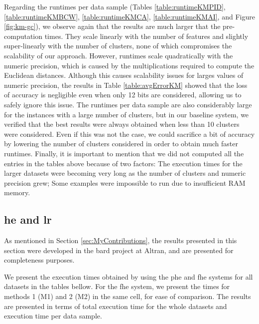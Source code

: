 Regarding the runtimes per data sample (Tables \ref{table:runtimeKMPID}, \ref{table:runtimeKMBCW}, \ref{table:runtimeKMCA}, \ref{table:runtimeKMAI}, and Figure \ref{fig:km-gc}), we observe again that the results are much larger that the pre-computation times. They scale linearly with the number of features and slightly super-linearly with the number of clusters, none of which compromises the scalability of our approach. However, runtimes scale quadratically with the numeric precision, which is caused by the multiplications required to compute the Euclidean distances. Although this causes scalability issues for larges values of numeric precision, the results in Table \ref{table:avgErrorKM} showed that the loss of accuracy is negligible even when only 12 bits are considered, allowing us to safely ignore this issue. The runtimes per data sample are also considerably large for the instances with a large number of clusters, but in our baseline system, we verified that the best results were always obtained when less than 10 clusters were considered. Even if this was not the case, we could sacrifice a bit of accuracy by lowering the number of clusters considered in order to obtain much faster runtimes. Finally, it is important to mention that we did not computed all the entries in the tables above because of two factors: The execution times for the larger datasets were becoming very long as the number of clusters and numeric precision grew; Some examples were impossible to run due to insufficient RAM memory.



\subsection{\acl{he} and \acl{lr}}
\label{ssec:exec_he_lr}

As mentioned in Section \ref{sec:MyContributions}, the results presented in this section were developed in the \ac{bard} project at Altran, and are presented for completeness purposes.


We present the execution times obtained by using the \ac{phe} and \ac{fhe} systems for all datasets in the tables bellow. For the \ac{fhe} system, we present the times for methods 1 (M1) and 2 (M2) in the same cell, for ease of comparison. The results are presented in terms of total execution time for the whole datasets and execution time per data sample. 


